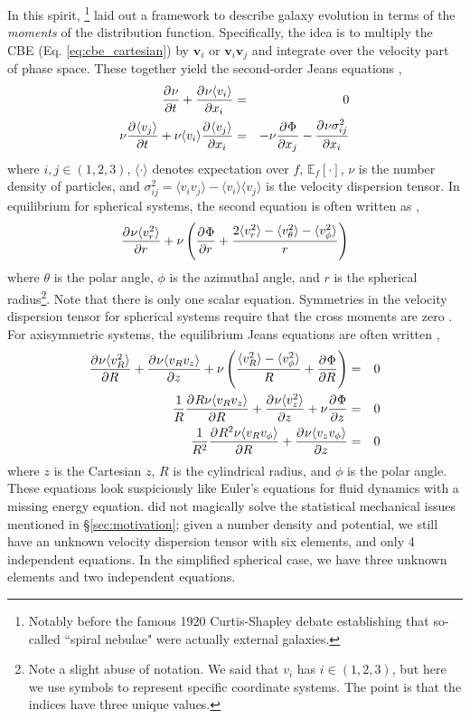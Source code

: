 In this spirit, \citet{jeans_1915}\footnote{Notably before the famous 1920 Curtis-Shapley debate \citep{curtis_shapley} establishing that so-called ``spiral nebulae" were actually external galaxies.} laid out a framework to describe galaxy evolution in terms of the \textit{moments} of the distribution function. Specifically, the idea is to multiply the CBE (Eq. \eqref{eq:cbe_cartesian}) by $\textbf{v}_i$ or $\textbf{v}_i \textbf{v}_j$ and integrate over the velocity part of phase space. These together yield the second-order Jeans equations \citep{BT},
\begin{eqnarray}
\frac{\partial^{} {\nu}}{\partial {t}^{}} + \frac{\partial^{} {\nu \langle v_i \rangle}}{\partial {x_i}^{}} &=& 0 \\
\nu \frac{\partial^{} {\langle v_j \rangle}}{\partial {t}^{}} + \nu \langle v_i \rangle \frac{\partial^{} {\langle v_j \rangle}}{\partial {x_i}^{}} &=& -\nu \frac{\partial^{} {\Phi}}{\partial {x_j}^{}} - \frac{\partial^{} {\nu \sigma^2_{ij}}}{\partial {x_i}^{}}\label{eq:jeans}
\end{eqnarray}
where $i,j \in (1,2,3)$, $\langle\cdot\rangle$ denotes expectation over $f$, $\mathbb{E}_f[\cdot]$, $\nu$ is the number density of particles, and $\sigma^2_{ij} = \langle v_i v_j \rangle - \langle v_i \rangle \langle v_j \rangle$ is the velocity dispersion tensor. In equilibrium for spherical systems, the second equation is often written as \citep{BT},
\begin{equation}
\frac{\partial^{} {\nu \langle v_r^2 \rangle}}{\partial {r}^{}} + \nu \left(\frac{\partial^{} {\Phi}}{\partial {r}^{}} + \frac{2 \langle v_r^2 \rangle - \langle v_\theta^2\rangle - \langle v_\phi^2 \rangle}{r} \right)
\end{equation}
where $\theta$ is the polar angle, $\phi$ is the azimuthal angle, and $r$ is the spherical radius\footnote{Note a slight abuse of notation. We said that $v_i$ has $i \in (1,2,3)$, but here we use symbols to represent specific coordinate systems. The point is that the indices have three unique values.}. Note that there is only one scalar equation. Symmetries in the velocity dispersion tensor for spherical systems require that the cross moments are zero \citep{BT}. For axisymmetric systems, the equilibrium Jeans equations are often written \citep{BT},
\begin{eqnarray}
\frac{\partial^{} {\nu \langle v_R^2 \rangle}}{\partial {R}^{}} + \frac{\partial^{} {\nu \langle v_R v_z \rangle}}{\partial {z}^{}} + \nu \left(\frac{\langle v_R^2 \rangle - \langle v_\phi^2 \rangle}{R} + \frac{\partial^{} {\Phi}}{\partial {R}^{}} \right) &=& 0\\
\frac{1}{R} \frac{\partial^{} {R \nu \langle v_R v_z \rangle}}{\partial {R}^{}} + \frac{\partial^{} {\nu \langle v_z^2 \rangle}}{\partial {z}^{}}+ \nu \frac{\partial^{} {\Phi}}{\partial {z}^{}} &=& 0\\
\frac{1}{R^2} \frac{\partial^{} {R^2 \nu \langle v_R v_\phi \rangle}}{\partial {R}^{}} + \frac{\partial^{} {\nu \langle v_z v_\phi\rangle}}{\partial {z}^{}} &=& 0
\end{eqnarray}
where $z$ is the Cartesian $z$, $R$ is the cylindrical radius, and $\phi$ is the polar angle. These equations look suspiciously like Euler's equations for fluid dynamics with a missing energy equation. \citet{jeans_1915} did not magically solve the statistical mechanical issues mentioned in \S\ref{sec:motivation}; given a number density and potential, we still have an unknown velocity dispersion tensor with six elements, and only 4 independent equations. In the simplified spherical case, we have three unknown elements and two independent equations.

